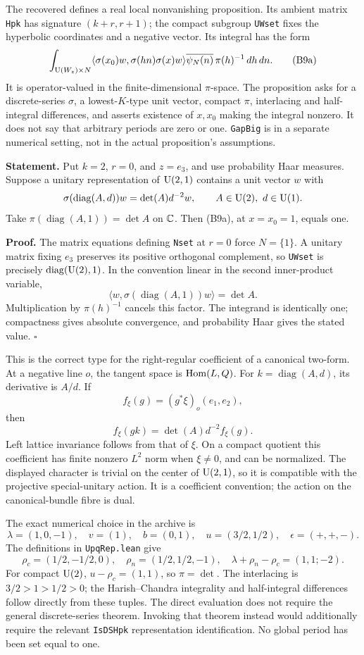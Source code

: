 \documentclass[11pt]{article}
\theoremstyle{definition}\newtheorem{definition}[theorem]{Definition}\newtheorem{remark}[theorem]{Remark}
\begin{document}
The recovered  defines a real local nonvanishing proposition. Its ambient matrix \texttt{Hpk} has signature $(k+r,r+1)$; the compact subgroup \texttt{UWset} fixes the hyperbolic coordinates and a negative vector. Its integral has the form
\[
 \int_{\operatorname{U}(W_z)\times N}
 \langle\sigma(x_0)w,\sigma(hn)\sigma(x)w\rangle
       \overline{\psi_N(n)}\,\pi(h)^{-1}\,dh\,dn.
 \tag{B9a}
\]
It is operator-valued in the finite-dimensional $\pi$-space. The proposition asks for a discrete-series $\sigma$, a lowest-$K$-type unit vector, compact $\pi$, interlacing and half-integral differences, and asserts existence of $x,x_0$ making the integral nonzero. It does not say that arbitrary periods are zero or one. \texttt{GapBig} is in a separate numerical setting, not in the actual proposition's assumptions.

\textbf{Statement.} Put $k=2$, $r=0$, and $z=e_3$, and use probability Haar measures. Suppose a unitary representation of $\operatorname{U}(2,1)$ contains a unit vector $w$ with
\[
 \sigma(\operatorname{diag}(A,d))w=\det(A)d^{-2}w,
 \qquad A\in\operatorname{U}(2),\ d\in\operatorname{U}(1).
\]
Take $\pi(\operatorname{diag}(A,1))=\det A$ on $\mathbb C$. Then (B9a), at $x=x_0=1$, equals one.

\textbf{Proof.} The matrix equations defining \texttt{Nset} at $r=0$ force $N=\{1\}$. A unitary matrix fixing $e_3$ preserves its positive orthogonal complement, so \texttt{UWset} is precisely $\operatorname{diag}(\operatorname{U}(2),1)$. In the convention linear in the second inner-product variable,
\[
 \langle w,\sigma(\operatorname{diag}(A,1))w\rangle=\det A.
\]
Multiplication by $\pi(h)^{-1}$ cancels this factor. The integrand is identically one; compactness gives absolute convergence, and probability Haar gives the stated value. \hfill$\square$

This is the correct type for the right-regular coefficient of a canonical two-form. At a negative line $o$, the tangent space is $\operatorname{Hom}(L,Q)$. For $k=\operatorname{diag}(A,d)$, its derivative is $A/d$. If
\[
 f_\xi(g)=(g^*\xi)_o(e_1,e_2),
\]
then
\[
 f_\xi(gk)=\det(A)d^{-2}f_\xi(g).
\]
Left lattice invariance follows from that of $\xi$. On a compact quotient this coefficient has finite nonzero $L^2$ norm when $\xi\ne0$, and can be normalized. The displayed character is trivial on the center of $\operatorname{U}(2,1)$, so it is compatible with the projective special-unitary action. It is a coefficient convention; the action on the canonical-bundle fibre is dual.

The exact numerical choice in the archive is
\[
 \lambda=(1,0,-1),\quad v=(1),\quad b=(0,1),\quad
 u=(3/2,1/2),\quad\epsilon=(+,+,-).
\]
The definitions in \texttt{UpqRep.lean} give
\[
 \rho_c=(1/2,-1/2,0),\quad\rho_n=(1/2,1/2,-1),\quad
 \lambda+\rho_n-\rho_c=(1,1;-2).
\]
For compact $\operatorname{U}(2)$, $u-\rho_c=(1,1)$, so $\pi=\det$. The interlacing is
$3/2>1>1/2>0$; the Harish--Chandra integrality and half-integral differences follow directly from these tuples. The direct evaluation does not require the general discrete-series theorem. Invoking that theorem instead would additionally require the relevant \texttt{IsDSHpk} representation identification. No global period has been set equal to one.
\end{document}
